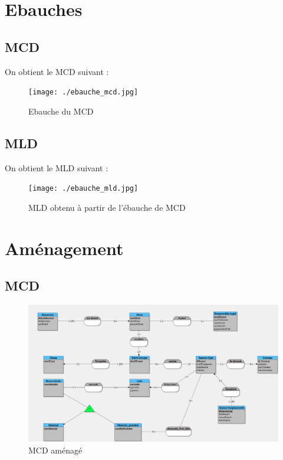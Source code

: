 \documentclass[12pt,french,titlepage]{article}
\begin{document}
	    
	   \section{Ebauches}
	   
	   \subsection{MCD}
	   On obtient le MCD suivant :
    \begin{figure}[H]
	      \centering
	      \texttt{[image: ./ebauche\_mcd.jpg]}
	      \caption{Ebauche du MCD}
	      
	   
	      
	  \end{figure}
	  
	  \subsection{MLD}
	  
	  On obtient le MLD suivant :

    \begin{figure}[H]
	      \centering
	      \texttt{[image: ./ebauche\_mld.jpg]}
	      \caption{MLD obtenu à partir de l'ébauche de MCD}
	      
	   
	      
	  \end{figure}
    
    \section{Aménagement}
    
    \subsection{MCD}
    
    \begin{figure}[H]
	      \centering
	      \includegraphics[scale=0.23]{./mcd_amenage.jpg}
	      \caption{MCD aménagé}
	      
	   
	      
	  \end{figure}
	  
\end{document}
